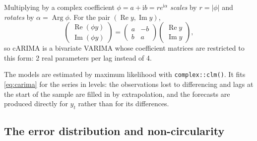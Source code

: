 \documentclass[11pt,a4paper]{article}
\newcommand{\iu}{\mathrm{i}}
\newcommand{\code}[1]{\texttt{#1}}
\DeclareMathOperator{\Arg}{Arg}
\renewcommand{\Re}{\operatorname{Re}}
\renewcommand{\Im}{\operatorname{Im}}
\begin{document}
Multiplying by a complex coefficient $\phi = a + \iu b = r e^{\iu\alpha}$ \emph{scales} by
$r = |\phi|$ and \emph{rotates} by $\alpha = \Arg\phi$. For the pair $(\Re y, \Im y)$,
\begin{equation}
  \begin{pmatrix} \Re(\phi y) \\ \Im(\phi y) \end{pmatrix}
  = \begin{pmatrix} a & -b \\ b & a \end{pmatrix}
    \begin{pmatrix} \Re y \\ \Im y \end{pmatrix},
\end{equation}
so cARIMA is a bivariate VARIMA whose coefficient matrices are restricted to this form: 2 real
parameters per lag instead of 4.

The models are estimated by maximum likelihood with \code{complex::clm()}. It fits
\eqref{eq:carima} for the series in levels: the observations lost to differencing and lags at the
start of the sample are filled in by extrapolation, and the forecasts are produced directly for
$y_t$ rather than for its differences.

\subsection{The error distribution and non-circularity}\label{sec:error}
\end{document}
